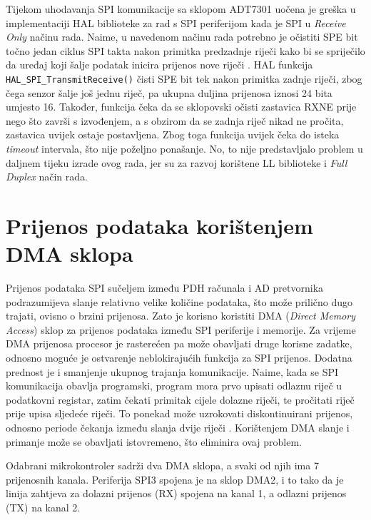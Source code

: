 Tijekom uhodavanja SPI komunikacije sa sklopom ADT7301 uočena je greška u implementaciji HAL biblioteke za rad s SPI periferijom kada je SPI u \textit{Receive Only} načinu rada. Naime, u navedenom načinu rada potrebno je očistiti SPE bit točno jedan ciklus SPI takta nakon primitka predzadnje riječi kako bi se spriječilo da uređaj koji šalje podatak inicira prijenos nove riječi \cite[str.~894]{stm32f4_manual}. HAL funkcija \texttt{HAL\_SPI\_TransmitReceive()} čisti SPE bit tek nakon primitka zadnje riječi, zbog čega senzor šalje još jednu riječ, pa ukupna duljina prijenosa iznosi 24 bita umjesto 16. Također, funkcija čeka da se sklopovski očisti zastavica RXNE prije nego što završi s izvođenjem, a s obzirom da se zadnja riječ nikad ne pročita, zastavica uvijek ostaje postavljena. Zbog toga funkcija uvijek čeka do isteka \textit{timeout} intervala, što nije poželjno ponašanje. No, to nije predstavljalo problem u daljnem tijeku izrade ovog rada, jer su za razvoj korištene LL biblioteke i \textit{Full Duplex} način rada.

\section{Prijenos podataka korištenjem DMA sklopa}

Prijenos podataka SPI sučeljem između PDH računala i AD pretvornika podrazumijeva slanje relativno velike količine podataka, što može prilično dugo trajati, ovisno o brzini prijenosa. Zato je korisno koristiti DMA (\textit{Direct Memory Access}) sklop za prijenos podataka između SPI periferije i memorije. Za vrijeme DMA prijenosa procesor je rasterećen pa može obavljati druge korisne zadatke, odnosno moguće je ostvarenje neblokirajućih funkcija za SPI prijenos. Dodatna prednost je i smanjenje ukupnog trajanja komunikacije. Naime, kada se SPI komunikacija obavlja programski, program mora prvo upisati odlaznu riječ u podatkovni registar, zatim čekati primitak cijele dolazne riječi, te pročitati riječ prije upisa sljedeće riječi. To ponekad može uzrokovati diskontinuirani prijenos, odnosno periode čekanja između slanja dvije riječi \cite[str.~890]{stm32f4_manual}. Korištenjem DMA slanje i primanje može se obavljati istovremeno, što eliminira ovaj problem.

Odabrani mikrokontroler sadrži dva DMA sklopa, a svaki od njih ima 7 prijenosnih kanala. Periferija SPI3 spojena je na sklop DMA2, i to tako da je linija zahtjeva za dolazni prijenos (RX) spojena na kanal 1, a odlazni prijenos (TX) na kanal 2. 

